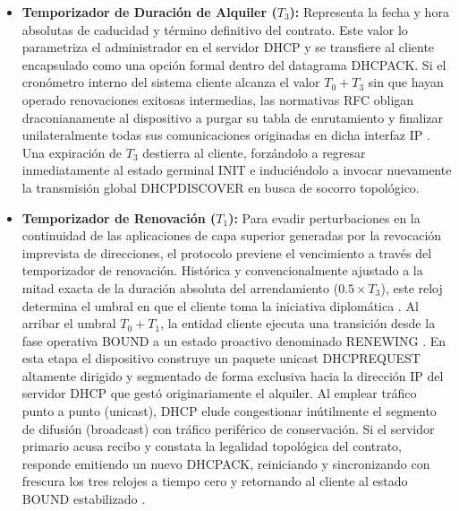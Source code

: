\documentclass[a4paper,12pt]{article}
\begin{document}
\begin{itemize}
    \item \textbf{Temporizador de Duración de Alquiler ($T_3$):} Representa la fecha y hora absolutas de caducidad y término definitivo del contrato. Este valor lo parametriza el administrador en el servidor DHCP y se transfiere al cliente encapsulado como una opción formal dentro del datagrama DHCPACK. Si el cronómetro interno del sistema cliente alcanza el valor $T_0 + T_3$ sin que hayan operado renovaciones exitosas intermedias, las normativas RFC obligan draconianamente al dispositivo a purgar su tabla de enrutamiento y finalizar unilateralmente todas sus comunicaciones originadas en dicha interfaz IP \cite{serviciosgs_dhcp, rfc2131}. Una expiración de $T_3$ destierra al cliente, forzándolo a regresar inmediatamente al estado germinal INIT e induciéndolo a invocar nuevamente la transmisión global DHCPDISCOVER en busca de socorro topológico.
    
    \item \textbf{Temporizador de Renovación ($T_1$):} Para evadir perturbaciones en la continuidad de las aplicaciones de capa superior generadas por la revocación imprevista de direcciones, el protocolo previene el vencimiento a través del temporizador de renovación. Histórica y convencionalmente ajustado a la mitad exacta de la duración absoluta del arrendamiento ($0.5 \times T_3$), este reloj determina el umbral en que el cliente toma la iniciativa diplomática \cite{serviciosgs_dhcp, juniper_dhcp_lease_times, rfc2131}. Al arribar el umbral $T_0 + T_1$, la entidad cliente ejecuta una transición desde la fase operativa BOUND a un estado proactivo denominado RENEWING \cite{serviciosgs_dhcp, rfc2131}. En esta etapa el dispositivo construye un paquete unicast DHCPREQUEST altamente dirigido y segmentado de forma exclusiva hacia la dirección IP del servidor DHCP que gestó originariamente el alquiler. Al emplear tráfico punto a punto (unicast), DHCP elude congestionar inútilmente el segmento de difusión (broadcast) con tráfico periférico de conservación. Si el servidor primario acusa recibo y constata la legalidad topológica del contrato, responde emitiendo un nuevo DHCPACK, reiniciando y sincronizando con frescura los tres relojes a tiempo cero y retornando al cliente al estado BOUND estabilizado \cite{serviciosgs_dhcp, rfc2131}.
    

\end{itemize}
\end{document}
